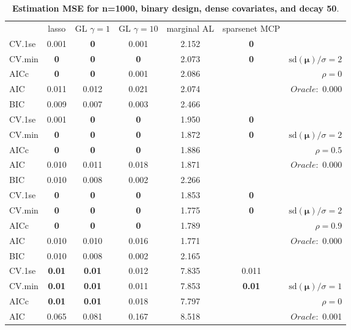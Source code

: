 \clearpage
\begin{table}\vspace{-.5cm}
\caption[l]{ { \bf Estimation MSE for n=1000, binary design, 
dense covariates, and  decay  50}.}
\vspace{-.5cm}
\footnotesize{}
\begin{center}
\begin{tabular}{l*{5}{c}|r}
& lasso & GL $\gamma=1$ & GL $\gamma=10$ & marginal AL & sparsenet MCP  & \\
 \cline{1-7}
CV.1se & 0.001 & {\bf 0} & 0.001 & 2.152 & {\bf 0} & \\
CV.min & {\bf 0} & {\bf 0} & {\bf 0} & 2.073 & {\bf 0} &  $\mathrm{sd}(\mathbf{\mu})/\sigma=2$ \\
AICc & {\bf 0} & {\bf 0} & 0.001 & 2.086 & & $\rho=0$ \\
AIC & 0.011 & 0.012 & 0.021 & 2.074 & &  \multirow{2}{*}{$Oracle: $ 0.000} \\
BIC & 0.009 & 0.007 & 0.003 & 2.466 & &  \\
 \hline 
CV.1se & 0.001 & {\bf 0} & {\bf 0} & 1.950 & {\bf 0} & \\
CV.min & {\bf 0} & {\bf 0} & {\bf 0} & 1.872 & {\bf 0} &  $\mathrm{sd}(\mathbf{\mu})/\sigma=2$ \\
AICc & {\bf 0} & {\bf 0} & {\bf 0} & 1.886 & & $\rho=0.5$ \\
AIC & 0.010 & 0.011 & 0.018 & 1.871 & &  \multirow{2}{*}{$Oracle: $ 0.000} \\
BIC & 0.010 & 0.008 & 0.002 & 2.266 & &  \\
 \hline 
CV.1se & {\bf 0} & {\bf 0} & {\bf 0} & 1.853 & {\bf 0} & \\
CV.min & {\bf 0} & {\bf 0} & {\bf 0} & 1.775 & {\bf 0} &  $\mathrm{sd}(\mathbf{\mu})/\sigma=2$ \\
AICc & {\bf 0} & {\bf 0} & {\bf 0} & 1.789 & & $\rho=0.9$ \\
AIC & 0.010 & 0.010 & 0.016 & 1.771 & &  \multirow{2}{*}{$Oracle: $ 0.000} \\
BIC & 0.010 & 0.008 & 0.002 & 2.165 & &  \\
 \hline 
CV.1se & {\bf 0.01} & {\bf 0.01} & 0.012 & 7.835 & 0.011 & \\
CV.min & {\bf 0.01} & {\bf 0.01} & 0.011 & 7.853 & {\bf 0.01} &  $\mathrm{sd}(\mathbf{\mu})/\sigma=1$ \\
AICc & {\bf 0.01} & {\bf 0.01} & 0.018 & 7.797 & & $\rho=0$ \\
AIC & 0.065 & 0.081 & 0.167 & 8.518 & &  \multirow{2}{*}{$Oracle: $ 0.001} \\

\end{tabular}
\end{center}
\end{table}

